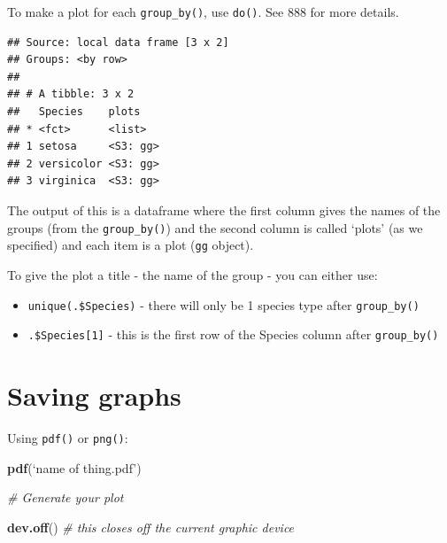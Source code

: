 \documentclass[]{book}
\newenvironment{Shaded}{\begin{snugshade}}{\end{snugshade}}
\newcommand{\KeywordTok}[1]{\textcolor[rgb]{0.13,0.29,0.53}{\textbf{#1}}}
\newcommand{\DataTypeTok}[1]{\textcolor[rgb]{0.13,0.29,0.53}{#1}}
\newcommand{\StringTok}[1]{\textcolor[rgb]{0.31,0.60,0.02}{#1}}
\newcommand{\CommentTok}[1]{\textcolor[rgb]{0.56,0.35,0.01}{\textit{#1}}}
\newcommand{\OperatorTok}[1]{\textcolor[rgb]{0.81,0.36,0.00}{\textbf{#1}}}
\newcommand{\NormalTok}[1]{#1}
\providecommand{\tightlist}{%
  \setlength{\itemsep}{0pt}\setlength{\parskip}{0pt}}
\begin{document}
To make a plot for each \texttt{group\_by()}, use \texttt{do()}. See 888
for more details.

\begin{Shaded}
\end{Shaded}

\begin{verbatim}
## Source: local data frame [3 x 2]
## Groups: <by row>
## 
## # A tibble: 3 x 2
##   Species    plots   
## * <fct>      <list>  
## 1 setosa     <S3: gg>
## 2 versicolor <S3: gg>
## 3 virginica  <S3: gg>
\end{verbatim}

The output of this is a dataframe where the first column gives the names
of the groups (from the \texttt{group\_by()}) and the second column is
called `plots' (as we specified) and each item is a plot (\texttt{gg}
object).

To give the plot a title - the name of the group - you can either use:

\begin{itemize}
\tightlist
\item
  \texttt{unique(.\$Species)} - there will only be 1 species type after
  \texttt{group\_by()}
\item
  \texttt{.\$Species{[}1{]}} - this is the first row of the Species
  column after \texttt{group\_by()}
\end{itemize}

\section{Saving graphs}\label{saving-graphs}

Using \texttt{pdf()} or \texttt{png()}:

\begin{Shaded}
\begin{Highlighting}[]
\KeywordTok{pdf}\NormalTok{(‘name of thing.pdf’)}
 
\CommentTok{# Generate your plot}

\KeywordTok{dev.off}\NormalTok{() }\CommentTok{# this closes off the current graphic device}
\end{Highlighting}
\end{Shaded}
\end{document}
